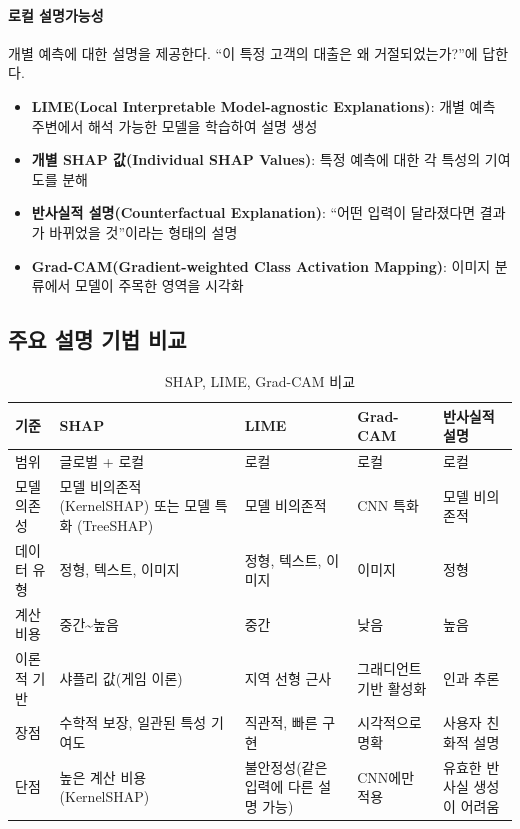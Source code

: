 \paragraph{로컬 설명가능성}
개별 예측에 대한 설명을 제공한다. ``이 특정 고객의 대출은 왜 거절되었는가?''에 답한다.
\begin{itemize}
  \item \textbf{LIME\cite{ribeiro2016why}(Local Interpretable Model-agnostic Explanations)}: 개별 예측 주변에서 해석 가능한 모델을 학습하여 설명 생성
  \item \textbf{개별 SHAP 값(Individual SHAP Values)}: 특정 예측에 대한 각 특성의 기여도를 분해
  \item \textbf{반사실적 설명(Counterfactual Explanation)}: ``어떤 입력이 달라졌다면 결과가 바뀌었을 것''이라는 형태의 설명
  \item \textbf{Grad-CAM(Gradient-weighted Class Activation Mapping)}: 이미지 분류에서 모델이 주목한 영역을 시각화
\end{itemize}

\subsection{주요 설명 기법 비교}
\label{sec:10.5.2}

\begin{table}[htbp]
\centering
\caption{SHAP, LIME, Grad-CAM 비교}
\label{tab:xai_comparison}
\begin{tabularx}{\textwidth}{p{2cm}p{2.3cm}p{2.3cm}p{2.3cm}X}
\toprule
\textbf{기준} & \textbf{SHAP} & \textbf{LIME} & \textbf{Grad-CAM} & \textbf{반사실적 설명} \\
\midrule
범위 & 글로벌 + 로컬 & 로컬 & 로컬 & 로컬 \\
\midrule
모델 의존성 & 모델 비의존적 (KernelSHAP) 또는 모델 특화 (TreeSHAP) & 모델 비의존적 & CNN 특화 & 모델 비의존적 \\
\midrule
데이터 유형 & 정형, 텍스트, 이미지 & 정형, 텍스트, 이미지 & 이미지 & 정형 \\
\midrule
계산 비용 & 중간\textasciitilde{}높음 & 중간 & 낮음 & 높음 \\
\midrule
이론적 기반 & 샤플리 값(게임 이론) & 지역 선형 근사 & 그래디언트 기반 활성화 & 인과 추론 \\
\midrule
장점 & 수학적 보장, 일관된 특성 기여도 & 직관적, 빠른 구현 & 시각적으로 명확 & 사용자 친화적 설명 \\
\midrule
단점 & 높은 계산 비용 (KernelSHAP) & 불안정성(같은 입력에 다른 설명 가능) & CNN에만 적용 & 유효한 반사실 생성이 어려움 \\
\bottomrule
\end{tabularx}
\end{table}

